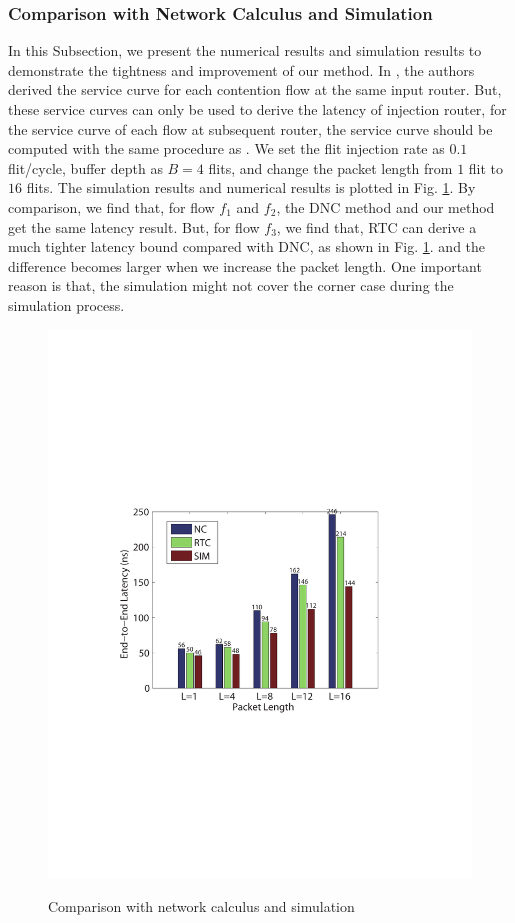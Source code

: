 \documentclass[10pt,journal]{IEEEtran}
\begin{document}
\subsubsection{Comparison with Network Calculus and Simulation}
In this Subsection, we present the numerical results and simulation results to demonstrate the tightness and improvement of our method. In \cite{Qian489900}, the authors derived the service curve for each contention flow at the same input router. But, these service curves can only be used to derive the latency of injection router, for the service curve of each flow at subsequent router, the service curve should be computed with the same procedure as \cite{qian2009analysis}. We set the flit injection rate as $0.1$ flit/cycle, buffer depth as $B=4$ flits, and change the packet length from $1$ flit to $16$ flits. The simulation results and numerical results is plotted in Fig. \ref{comparison}. By comparison, we find that, for flow $f_1$ and $f_2$, the DNC method and our method get the same latency result. But, for flow $f_3$, we find that, RTC can derive a much tighter latency bound compared with DNC, as shown in Fig. \ref{comparison}. and the difference becomes larger when we increase the packet length. One important reason is that, the simulation might not cover the corner case during the simulation process.
\begin{figure}
  \centering
  \includegraphics[scale=0.6]{figures/comparison.pdf}\\
  \caption{Comparison with network calculus and simulation}\label{comparison}
\end{figure}
\end{document}
